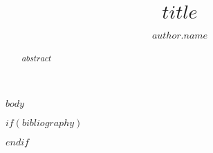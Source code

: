 \documentclass{$documentclass$}
\title{$title$}
\author{$author.name$}
\begin{document}
\maketitle

\begin{abstract}
$abstract$
\end{abstract}

$body$

$if(bibliography)$


$endif$

\makesignature
\end{document}
